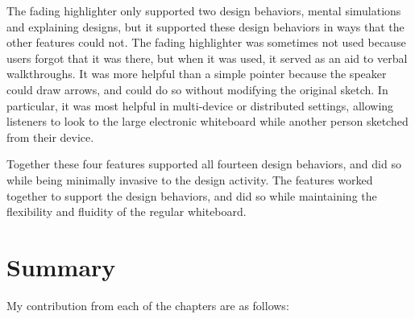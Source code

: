 \documentclass[12pt,fleqn]{ucithesis}
\begin{document}
The fading highlighter only supported two design behaviors, mental simulations and explaining designs, but it supported these design behaviors in ways that the other features could not. The fading highlighter was sometimes not used because users forgot that it was there, but when it was used, it served as an aid to verbal walkthroughs. It was more helpful than a simple pointer because the speaker could draw arrows, and could do so without modifying the original sketch. In particular, it was most helpful in multi-device or distributed settings, allowing listeners to look to the large electronic whiteboard while another person sketched from their device. 

Together these four features supported all fourteen design behaviors, and did so while being minimally invasive to the design activity. The features worked together to support the design behaviors, and did so while maintaining the flexibility and fluidity of the regular whiteboard. 

\section{Summary}

My contribution from each of the chapters are as follows:
\end{document}
